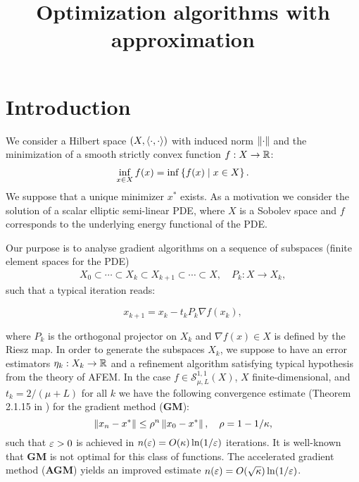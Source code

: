 \documentclass[12pt,english]{article}
\begin{document}

\title{Optimization algorithms with approximation}
\author{}
\maketitle
\tableofcontents

%
\section{Introduction}\label{sec:}
%
%
We consider a Hilbert space $(X,\langle\cdot,\cdot\rangle)$ with induced norm $\left\|\cdot\right\|$ and the minimization of a smooth strictly convex function $f:X\to\mathbb R$:
%
\begin{align*}
\inf_{x\in X} f(x) = \inf\left\{f(x)\;\middle|\;x\in X\right\}.
\end{align*}
%
We suppose that a unique minimizer $x^*$ exists.
%
As a motivation we consider the solution of a scalar elliptic semi-linear PDE, where $X$ is a Sobolev space and $f$ corresponds to the underlying energy functional of the PDE.

Our purpose is to analyse gradient algorithms on a sequence of subspaces (finite element spaces for the PDE)
%
\begin{align*}
X_0 \subset \cdots \subset X_k \subset X_{k+1}\subset \cdots \subset X,\quad P_k: X\to X_k,
\end{align*}
%
such that a typical iteration reads: 
%
\begin{yellow}
\begin{equation}\label{eq:pgm}
x_{k+1} = x_k - t_k P_{k}\nabla f(x_k),
\end{equation}
\end{yellow}
%
where $P_k$ is the orthogonal projector on $X_k$ and $\nabla f(x)\in X$ is defined by the Riesz map. In order to generate the subspaces $X_k$, we suppose to have 
an error estimators $\eta_k:X_k\to\mathbb R$ and a refinement algorithm satisfying typical hypothesis from the theory of AFEM.
% 
In the case $f\in \mathcal S^{1,1}_{\mu,L}(X)$, $X$ finite-dimensional, and $t_k=2/(\mu+L)$ for all $k$ we have the following {convergence estimate}  (Theorem 2.1.15 in \cite{Nesterov18}) for the gradient method (\textbf{GM}):
%
\begin{equation}\label{eq:gmlipsmoothest}
\left\|x_n-x^*\right\| \le \rho^n\left\|x_0-x^*\right\|,\quad \rho = 1-1/\kappa,
\end{equation}
%
such that $\varepsilon>0$ is achieved in $n(\varepsilon) = O(\kappa)\ln(1/\varepsilon)$ iterations.
It is well-known that \textbf{GM} is not optimal for this class of functions. The accelerated gradient method (\textbf{AGM}) \cite{Nesterov18} yields an improved estimate  $n(\varepsilon) = O(\sqrt{\kappa})\ln(1/\varepsilon)$.
\end{document}
